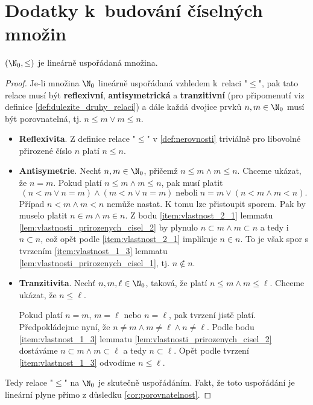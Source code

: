 \chapter{Dodatky k~budování číselných množin}\label{chap:dodatky_k_budovani_cis_mn}
\begin{theorem}
    $(\N_0,\leq)$ je lineárně uspořádaná množina.
\end{theorem}
\begin{proof}
    Je-li množina $\N_0$ lineárně uspořádaná vzhledem k~relaci "$\leq$", pak tato relace musí být \textbf{reflexivní}, \textbf{antisymetrická} a \textbf{tranzitivní} (pro připomenutí viz definice \ref{def:dulezite_druhy_relaci}) a dále každá dvojice prvků $n,m\in\N_0$ musí být porovnatelná, tj. $n\leq m\lor m\leq n$.
    \begin{itemize}
        \item \textbf{Reflexivita}. Z definice relace "$\leq$" v \ref{def:nerovnosti} triviálně pro libovolné přirozené číslo $n$ platí $n\leq n$.
        \item \textbf{Antisymetrie}. Nechť $n,m\in\N_0$, přičemž $n\leq m \land m\leq n$. Chceme ukázat, že $n=m$. Pokud platí $n\leq m \land m\leq n$, pak musí platit
        \begin{equation*}
            (n<m\lor n=m) \land (m<n\lor n=m)\;\text{neboli}\;n=m\lor (n<m\land m<n).
        \end{equation*}
        Případ $n<m\land m<n$ nemůže nastat. K tomu lze přistoupit sporem. Pak by muselo platit $n\in m\land m\in n$. Z bodu \ref{item:vlastnost_2_1} lemmatu \ref{lem:vlastnosti_prirozenych_cisel_2} by plynulo $n\subset m\land m\subset n$ a tedy i $n\subset n$, což opět podle \ref{item:vlastnost_2_1} implikuje $n\in n$. To je však spor s tvrzením \ref{item:vlastnost_1_3} lemmatu \ref{lem:vlastnosti_prirozenych_cisel_1}, tj. $n\notin n$.
        \item \textbf{Tranzitivita}. Nechť $n,m,\ell\in\N_0$, taková, že platí $n\leq m \land m\leq\ell$. Chceme ukázat, že $n\leq\ell$.\par
        Pokud platí $n=m$, $m=\ell$ nebo $n=\ell$, pak tvrzení jistě platí. Předpokládejme nyní, že $n\neq m\land m\neq\ell\land n\neq\ell$. Podle bodu \ref{item:vlastnost_1_3} lemmatu \ref{lem:vlastnosti_prirozenych_cisel_2} dostáváme $n\subset m\land m\subset\ell$ a tedy $n\subset\ell$. Opět podle tvrzení \ref{item:vlastnost_1_3} odvodíme $n\leq\ell$.
    \end{itemize}
    Tedy relace "$\leq$" na $\N_0$ je skutečně uspořádáním. Fakt, že toto uspořádání je lineární plyne přímo z důsledku \ref{cor:porovnatelnost}.
\end{proof}